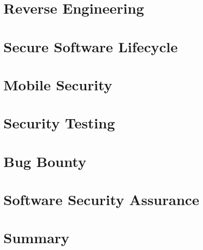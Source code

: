 \documentclass[main.tex,fontsize=8pt,paper=a4,paper=portrait,DIV=calc,]{scrartcl}
\begin{document}
\section{Reverse Engineering}

\section{Secure Software Lifecycle}

\section{Mobile Security}

\section{Security Testing}

\section{Bug Bounty}

\section{Software Security Assurance}

\section{Summary}
\end{document}
